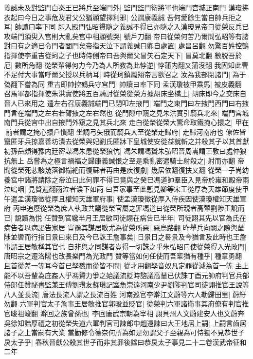 義誠未及對監門白秦王已將兵至端門外|{
	監門監門衛將軍也端門宫城正南門}
漢瓊拂衣起曰今日之事危及君父公猶顧望擇利邪|{
	公謂康義誠}
吾何愛餘生當自帥兵拒之耳|{
	帥讀曰率下同}
即入殿門弘昭贇隨之義誠不得已亦隨之入漢瓊見帝曰從榮反兵已攻端門須臾入宫則大亂矣宫中相顧號哭|{
	號戶刀翻}
帝曰從榮何苦乃爾問弘昭等有諸對曰有之適已令門者闔門矣帝指天泣下謂義誠曰卿自處置|{
	處昌呂翻}
勿驚百姓控鶴指揮使李重吉從珂之子也時侍側帝曰吾與爾父冒矢石定天下|{
	冒莫北翻}
數脱吾於厄|{
	數所角翻}
從榮輩得何力今乃為人所教為此悖逆|{
	悖蒲内翻又蒲沒翻}
我固知此曹不足付大事當呼爾父授以兵柄耳|{
	時從珂鎮鳳翔帝言欲召之}
汝為我部閉諸門|{
	為于偽翻下嘗為同}
重吉即帥控鶴兵守宫門|{
	帥讀曰率下同}
孟漢瓊被甲乘馬|{
	被皮義翻}
召馬軍都指揮使朱洪實使將五百騎討從榮從榮方據胡床坐橋上|{
	胡床即今之交床自晉人已來用之}
遣左右召康義誠端門已閉叩左掖門|{
	端門之東門曰左掖門西門曰右掖門言在端門之左右若臂掖之左右然也}
從門隙中窺之見朱洪實引騎兵北來|{
	端門宫城南門兵從宫中出自掖門外窺之見其兵北來}
走白從榮從榮大驚命取鐵掩心擐之|{
	甲在前者謂之掩心擐戶慣翻}
坐調弓矢俄而騎兵大至從榮走歸府|{
	走歸河南府也}
僚佐皆竄匿牙兵掠嘉善坊潰去從榮與妃劉氏匿牀下皇城使安從益就斬之并殺其子以其首獻初孫岳頗得豫内廷密謀馮朱患從榮狼伉|{
	馮朱謂馮贇朱弘昭晉周嵩謂王敦曰處仲狼抗無上}
岳嘗為之極言禍福之歸康義誠恨之至是乘亂密遣騎士射殺之|{
	射而亦翻}
帝聞從榮死悲駭幾落御榻絶而復蘇者再由是疾復劇|{
	幾居依翻復扶又翻}
從榮一子尚幼養宫中諸將請除之帝泣曰此何罪不得已竟與之癸巳馮道帥羣臣入見帝於雍和殿帝雨泣嗚咽|{
	見賢遍翻雨泣者淚下如雨}
曰吾家事至此慙見卿等宋王從厚為天雄節度使甲午遣孟漢瓊徵從厚且權知天雄軍府事|{
	使孟漢瓊徵從厚入侍疾因使漢瓊權知天雄軍府}
丙申追廢從榮為庶人執政共議從榮官屬之罪馮道曰從榮所親者高輦劉陟王說而已|{
	說讀為悦}
任贊到官纔半月王居敏司徒詡在病告已半年|{
	司徒詡其先以官為氏在病告者以病謁告家居}
豈豫其謀居敏尤為從榮所惡|{
	惡烏路翻}
昨舉兵向闕之際與輦陟並轡而行指日景曰來日及今已誅王詹事矣|{
	日景日之晷景及今猶言及此時也王詹事謂王居敏稱其官也}
自非與之同謀者豈得一切誅之乎朱弘昭曰使從榮得入光政門|{
	唐昭宗之遷洛陽也改長樂門為光政門}
贊等當如何任使而吾輩猶有種乎|{
	種章勇翻}
且首從差一等耳今首已孥戮而從皆不問|{
	從才用翻孥音奴凡定罪從減為首一等}
主上能不以吾輩為庇姦人乎馮贇力爭之始議流貶時諮議高輦已伏誅丁酉元帥府判官兵部侍郎任贊祕書監兼王傅劉瓚友蘇瓚記室魚崇遠河南少尹劉陟判官司徒詡推官王說等八人並長流|{
	唐法長流人謂之長流百姓}
河南巡官李澣江文蔚等六人勒歸田里|{
	蔚紆勿翻}
六軍判官太子詹事王居敏推官郭晙並貶官|{
	從榮判六軍諸衛事其府僚有判官推官晙祖峻翻}
澣回之族曾孫也|{
	李回唐武宗朝為宰相}
詡貝州人文蔚建安人也文蔚奔吳徐知誥厚禮之初從榮失道六軍判官司諫郎中趙遠諫曰大王地居上嗣|{
	上嗣言齒居諸子之上當嗣有大業}
當勤修令德奈何所為如是勿謂父子至親為可恃獨不見恭世子戾太子乎|{
	春秋晉獻公殺其世子而非其罪後諡曰恭戾太子事見二十二卷漢武帝征和二年}
